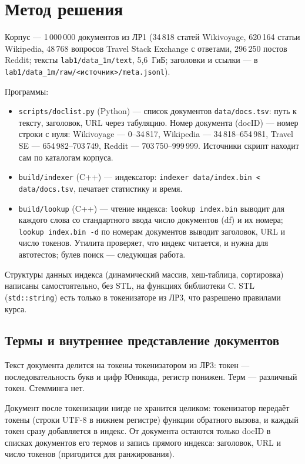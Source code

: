 \pagebreak
\section{Метод решения}
Корпус --- 1\,000\,000 документов из ЛР1 (34\,818 статей Wikivoyage, 620\,164 статьи Wikipedia, 48\,768 вопросов Travel Stack Exchange с ответами, 296\,250 постов Reddit; тексты \texttt{lab1/data\_1m/text}, 5,6~ГиБ; заголовки и ссылки --- в \texttt{lab1/data\_1m/raw/<источник>/meta.jsonl}).

Программы:
\begin{itemize}
    \item \texttt{scripts/doclist.py} (Python) --- список документов \texttt{data/docs.tsv}: путь к тексту, заголовок, URL через табуляцию. Номер документа (docID) --- номер строки с нуля: Wikivoyage --- 0--34\,817, Wikipedia --- 34\,818--654\,981, Travel SE --- 654\,982--703\,749, Reddit --- 703\,750--999\,999. Источники скрипт находит сам по каталогам корпуса.
    \item \texttt{build/indexer} (C++) --- индексатор: \texttt{indexer data/index.bin < data/docs.tsv}, печатает статистику и время.
    \item \texttt{build/lookup} (C++) --- чтение индекса: \texttt{lookup index.bin} выводит для каждого слова со стандартного ввода число документов (df) и их номера; \texttt{lookup index.bin -d} по номерам документов выводит заголовок, URL и число токенов. Утилита проверяет, что индекс читается, и нужна для автотестов; булев поиск --- следующая работа.
\end{itemize}
Структуры данных индекса (динамический массив, хеш-таблица, сортировка) написаны самостоятельно, без STL, на функциях библиотеки C. STL (\texttt{std::string}) есть только в токенизаторе из ЛР3, что разрешено правилами курса.

\subsection{Термы и внутреннее представление документов}
Текст документа делится на токены токенизатором из ЛР3: токен --- последовательность букв и цифр Юникода, регистр понижен. Терм --- различный токен. Стемминга нет.

Документ после токенизации нигде не хранится целиком: токенизатор передаёт токены (строки UTF-8 в нижнем регистре) функции обратного вызова, и каждый токен сразу добавляется в индекс. От документа остаются только docID в списках документов его термов и запись прямого индекса: заголовок, URL и число токенов (пригодится для ранжирования).

